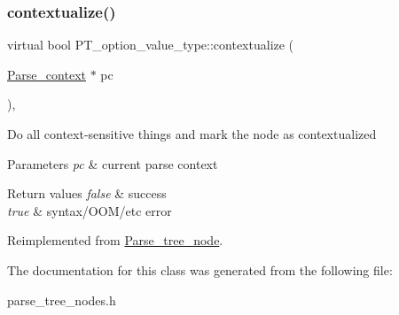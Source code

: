 \subsubsection{\texorpdfstring{contextualize()}{contextualize()}}
{\footnotesize\ttfamily virtual bool P\+T\+\_\+option\+\_\+value\+\_\+type\+::contextualize (\begin{DoxyParamCaption}\item[{\mbox{\hyperlink{structParse__context}{Parse\+\_\+context}} $\ast$}]{pc }\end{DoxyParamCaption})\hspace{0.3cm}{\ttfamily [inline]}, {\ttfamily [virtual]}}

Do all context-\/sensitive things and mark the node as contextualized


\begin{DoxyParams}{Parameters}
{\em pc} & current parse context\\
\hline
\end{DoxyParams}

\begin{DoxyRetVals}{Return values}
{\em false} & success \\
\hline
{\em true} & syntax/\+O\+O\+M/etc error \\
\hline
\end{DoxyRetVals}


Reimplemented from \mbox{\hyperlink{classParse__tree__node_a22d93524a537d0df652d7efa144f23da}{Parse\+\_\+tree\+\_\+node}}.



The documentation for this class was generated from the following file\+:\begin{DoxyCompactItemize}
\item 
parse\+\_\+tree\+\_\+nodes.\+h\end{DoxyCompactItemize}
